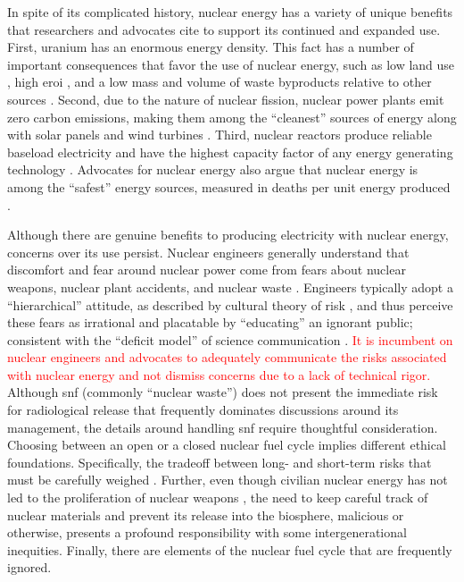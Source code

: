 In spite of its complicated history, nuclear energy has a variety of unique
benefits that researchers and advocates cite to support its continued and
expanded use. First, uranium has an enormous energy density. This fact has a
number of important consequences that favor the use of nuclear energy, such as
low land use \cite{lovering_land-use_2022,van_zalk_spatial_2018}, high \ac{eroi}
\cite{weisbach_energy_2013,murphy_energy_2022}, and a low mass and volume of
waste byproducts relative to other sources
\cite{liu_wind_2017,chowdhury_overview_2020,holdsworth_spent_2023,taebi_recycle_2008}.
Second, due to the nature of nuclear fission, nuclear power plants emit zero
carbon emissions, making them among the ``cleanest'' sources of energy along
with solar panels and wind turbines
\cite{nicholson_life_2021,intergovernmental_panel_on_climate_change_climate_2021,
brook_why_2014,van_de_graaff_understanding_2016}. Third, nuclear reactors
produce reliable baseload electricity and have the highest capacity factor of
any energy generating technology
\cite{brook_why_2014,van_de_graaff_understanding_2016}. Advocates for nuclear
energy also argue that nuclear energy is among the ``safest'' energy sources,
measured in deaths per unit energy produced
\cite{brook_why_2014,van_de_graaff_understanding_2016}.


Although there are genuine benefits to producing electricity with nuclear
energy, concerns over its use persist. Nuclear engineers generally understand
that discomfort and fear around nuclear power come from fears about nuclear
weapons, nuclear plant accidents, and nuclear waste \cite{roeser_nuclear_2011}.
Engineers typically adopt a ``hierarchical'' attitude, as described by cultural
theory of risk \cite{van_de_graaff_understanding_2016,mcneeley_cultural_2014},
and thus perceive these fears as irrational and placatable by ``educating'' an
ignorant public; consistent with the ``deficit model'' of science communication
\cite{simis_lure_2016,patenaude_topical_2022}. \textcolor{red}{It is incumbent
on nuclear engineers and advocates to adequately communicate the risks
associated with nuclear energy and not dismiss concerns due to a lack of
technical rigor.} Although \Ac{snf} (commonly ``nuclear waste'') does not
present the immediate risk for radiological release that frequently dominates
discussions around its management, the details around handling \ac{snf} require
thoughtful consideration. Choosing between an open or a closed nuclear fuel
cycle implies different ethical foundations. Specifically, the tradeoff between
long- and short-term risks that must be carefully weighed
\cite{taebi_recycle_2008}. Further, even though civilian nuclear energy has not
led to the proliferation of nuclear weapons
\cite{herzog_nuclear_2020,miller_why_2017}, the need to keep careful track of
nuclear materials and prevent its release into the biosphere, malicious or
otherwise, presents a profound responsibility with some intergenerational
inequities. Finally, there are elements of the nuclear fuel cycle that 
are frequently ignored. 

